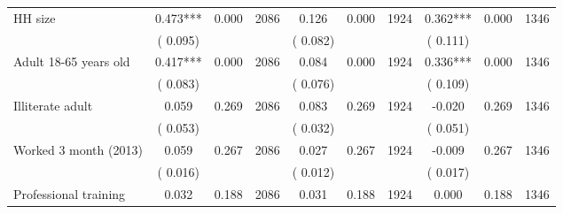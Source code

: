 \begin{tabular}{l*{9}{c}}
 HH size                 &              0.473***          &        0.000 & 2086          &              0.126 &        0.000 & 1924                   &        0.362*** &        0.000 & 1346                                 \\ 
                               &        (       0.095) & &                                                                 &       (       0.082) & &                                                          &       (       0.111) & &                                          \\ 
 Adult 18-65 years old                 &              0.417***          &        0.000 & 2086          &              0.084 &        0.000 & 1924                   &        0.336*** &        0.000 & 1346                                 \\ 
                               &        (       0.083) & &                                                                 &       (       0.076) & &                                                          &       (       0.109) & &                                          \\ 
 Illiterate adult                 &              0.059          &        0.269 & 2086          &              0.083 &        0.269 & 1924                   &       -0.020 &        0.269 & 1346                                 \\ 
                               &        (       0.053) & &                                                                 &       (       0.032) & &                                                          &       (       0.051) & &                                          \\ 
 Worked 3 month (2013)                 &              0.059          &        0.267 & 2086          &              0.027 &        0.267 & 1924                   &       -0.009 &        0.267 & 1346                                 \\ 
                               &        (       0.016) & &                                                                 &       (       0.012) & &                                                          &       (       0.017) & &                                          \\ 
 Professional training                 &              0.032          &        0.188 & 2086          &              0.031 &        0.188 & 1924                   &        0.000 &        0.188 & 1346                                 \\ 

\end{tabular}
